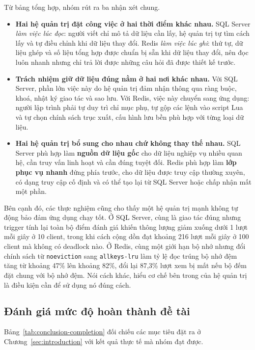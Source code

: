 Từ bảng tổng hợp, nhóm rút ra ba nhận xét chung.

\begin{itemize}
    \item \textbf{Hai hệ quản trị đặt công việc ở hai thời điểm khác nhau.} SQL Server \emph{làm việc lúc đọc}: người viết chỉ mô tả dữ liệu cần lấy, hệ quản trị tự tìm cách lấy và tự điều chỉnh khi dữ liệu thay đổi. Redis \emph{làm việc lúc ghi}: thứ tự, dữ liệu ghép và số liệu tổng hợp được chuẩn bị sẵn khi dữ liệu thay đổi, nên đọc luôn nhanh nhưng chỉ trả lời được những câu hỏi đã được thiết kế trước.
    \item \textbf{Trách nhiệm giữ dữ liệu đúng nằm ở hai nơi khác nhau.} Với SQL Server, phần lớn việc này do hệ quản trị đảm nhận thông qua ràng buộc, khoá, nhật ký giao tác và sao lưu. Với Redis, việc này chuyển sang ứng dụng: người lập trình phải tự duy trì chỉ mục phụ, tự gộp các lệnh vào script Lua và tự chọn chính sách trục xuất, cấu hình lưu bền phù hợp với từng loại dữ liệu.
    \item \textbf{Hai hệ quản trị bổ sung cho nhau chứ không thay thế nhau.} SQL Server phù hợp làm \textbf{nguồn dữ liệu gốc} cho dữ liệu nghiệp vụ nhiều quan hệ, cần truy vấn linh hoạt và cần đúng tuyệt đối. Redis phù hợp làm \textbf{lớp phục vụ nhanh} đứng phía trước, cho dữ liệu được truy cập thường xuyên, có dạng truy cập cố định và có thể tạo lại từ SQL Server hoặc chấp nhận mất một phần.
\end{itemize}

Bên cạnh đó, các thực nghiệm cũng cho thấy một hệ quản trị mạnh không tự động bảo đảm ứng dụng chạy tốt. Ở SQL Server, cùng là giao tác đúng nhưng trigger tính lại toàn bộ điểm đánh giá khiến thông lượng giảm xuống dưới 1 lượt mỗi giây ở 10 client, trong khi cách cộng dồn đạt khoảng 216 lượt mỗi giây ở 100 client mà không có deadlock nào. Ở Redis, cùng một giới hạn bộ nhớ nhưng đổi chính sách từ \texttt{noeviction} sang \texttt{allkeys-lru} làm tỷ lệ đọc trúng bộ nhớ đệm tăng từ khoảng 47\% lên khoảng 82\%, đổi lại 87,3\% lượt xem bị mất nếu bộ đếm đặt chung với bộ nhớ đệm. Nói cách khác, hiểu cơ chế bên trong của hệ quản trị là điều kiện cần để sử dụng nó đúng cách.

\subsection{Đánh giá mức độ hoàn thành đề tài}
\label{subsec:conclusion-completion}

Bảng~\ref{tab:conclusion-completion} đối chiếu các mục tiêu đặt ra ở Chương~\ref{sec:introduction} với kết quả thực tế mà nhóm đạt được.

